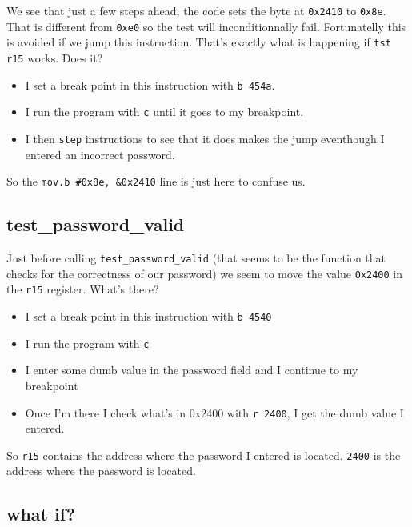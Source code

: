 \documentclass[a4paper,11pt]{article}
\begin{document}
We see that just a few steps ahead, the code sets the byte at
\texttt{0x2410} to \texttt{0x8e}. That is different from \texttt{0xe0}
so the test will inconditionnally fail. Fortunatelly this is avoided if
we jump this instruction. That's exactly what is happening if
\texttt{tst r15} works. Does it?

\begin{itemize}
\itemsep1pt\parskip0pt
\item
  I set a break point in this instruction with \texttt{b 454a}.
\item
  I run the program with \texttt{c} until it goes to my breakpoint.
\item
  I then \texttt{step} instructions to see that it does makes the jump
  eventhough I entered an incorrect password.
\end{itemize}

So the \texttt{mov.b \#0x8e, \&0x2410} line is just here to confuse us.

\subsection{test\_password\_valid}\label{testux5fpasswordux5fvalid}

Just before calling \texttt{test\_password\_valid} (that seems to be the
function that checks for the correctness of our password) we seem to
move the value \texttt{0x2400} in the \texttt{r15} register. What's
there?

\begin{itemize}
\itemsep1pt\parskip0pt
\item
  I set a break point in this instruction with \texttt{b 4540}
\item
  I run the program with \texttt{c}
\item
  I enter some dumb value in the password field and I continue to my
  breakpoint
\item
  Once I'm there I check what's in 0x2400 with \texttt{r 2400}, I get
  the dumb value I entered.
\end{itemize}

So \texttt{r15} contains the address where the password I entered is
located. \texttt{2400} is the address where the password is located.

\subsection{what if?}\label{what-if}
\end{document}
